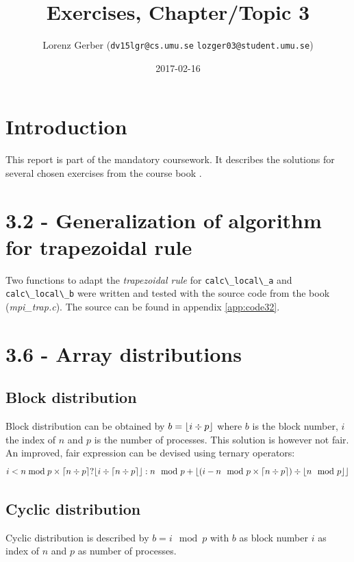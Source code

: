 \documentclass[a4paper,11pt,twoside]{article}
\title{Exercises, Chapter/Topic 3}
\author{Lorenz Gerber ({\tt{dv15lgr@cs.umu.se}} {\tt{lozger03@student.umu.se}})}
\date{2017-02-16}
\DeclarePairedDelimiter{\ceil}{\lceil}{\rceil}
\DeclarePairedDelimiter{\floor}{\lfloor}{\rfloor}
\begin{document}
\lstset{language=C}
\maketitle
\thispagestyle{empty}
\newpage
\tableofcontents
\thispagestyle{empty}
\newpage

\clearpage
{}

\section{Introduction}
This report is part of the mandatory coursework. It describes the solutions for several chosen exercises from the course book \cite{pacheco2011}.

\section{3.2 - Generalization of algorithm for trapezoidal rule}
Two functions to adapt the \textit{trapezoidal rule} for \verb+calc\_local\_a+ and \verb+calc\_local\_b+ were written and tested with the source code from the book (\textit{mpi\_trap.c}). The source can be found in appendix \ref{app:code32}.

\section{3.6 - Array distributions}

\subsection*{Block distribution}
Block distribution can be obtained by $b = \floor*{i \div p}$ where $b$ is the block number, $i$ the index of $n$ and $p$ is the number of processes. This solution is however not fair. An improved, fair expression can be devised using ternary operators:
\begin{equation*}
i< n\bmod p \times \ceil*{n \div p} ? \floor*{i \div \ceil*{n \div p}} : n\mod p + \floor*{(i -n\mod p \times \ceil*{n \div p}) \div \floor*{n\mod p}}
\end{equation*} 

\subsection*{Cyclic distribution}
Cyclic distribution is described by $b = i\mod p$ with $b$ as block number $i$ as index of $n$ and $p$ as number of processes. 
\end{document}

